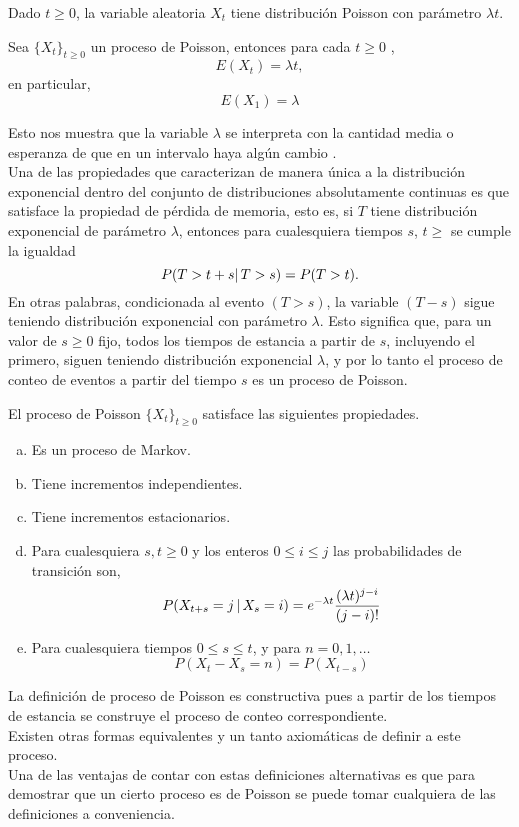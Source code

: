     \begin{Prop}
        Dado $t\geq 0$, la variable aleatoria $X_t$ tiene distribución Poisson con parámetro $\lambda t$.
    \end{Prop}
   \begin{Cor}
   Sea $\{X_t\}_{t\geq 0}$ un proceso de Poisson, entonces para cada $t\geq 0$ , $$E(X_t)=\lambda t,$$ en particular, 
   $$E(X_1)=\lambda$$
   
   \end{Cor}
   Esto nos muestra que la variable $\lambda$ se interpreta con la cantidad media o esperanza de que en un intervalo haya algún cambio .\\
   Una de las propiedades que caracterizan de manera única a la distribución exponencial dentro del conjunto de distribuciones absolutamente continuas es que satisface la propiedad de pérdida de memoria, esto es, si $T$ tiene distribución exponencial de parámetro $\lambda$, entonces para cualesquiera tiempos $s$, $t\geq$ se cumple la igualdad $$P(T>t+s|\thinspace T>s)=P(T>t).$$
    En otras palabras, condicionada al evento $(T>s)$, la variable $(T-s)$ sigue teniendo distribución exponencial con parámetro $\lambda$.
    Esto significa que, para un valor de $s\geq 0$ fijo, todos los tiempos de estancia a partir de $s$, incluyendo el primero, siguen teniendo distribución exponencial $\lambda$, y por lo tanto el proceso de conteo de eventos a partir del tiempo $s$ es un proceso de Poisson.
    \begin{Prop} 
        El proceso de Poisson $\{X_t\}_{t\geq 0}$ satisface las siguientes
        propiedades.
        \label{prop_procPoisson_constructiva}
        \begin{enumerate}[a)]
            \item  Es un proceso de Markov.
            \item Tiene incrementos independientes.
            \item Tiene incrementos estacionarios.
            \item Para cualesquiera $s,t \geq 0$ y los enteros $0\leq i\leq j$ las probabilidades de transición son, $$P(X_{t+s}=j\thinspace|\thinspace X_s=i)= e^{-\lambda t}\frac{(\lambda t)^{j-i}}{(j-i)!}$$
            \item Para cualesquiera tiempos $0\leq s\leq t$, y para $n=0,1,\ldots$
            $$P(X_t-X_s=n)=P(X_{t-s})$$
        \end{enumerate}
    \end{Prop}
    La definición de proceso de Poisson es constructiva pues a partir de los
    tiempos de estancia se construye el proceso de conteo correspondiente.\\
    Existen otras formas equivalentes y un tanto axiomáticas de definir a este
    proceso.\\
    Una de las ventajas de contar con estas definiciones alternativas es que para demostrar que un cierto proceso es de Poisson se puede tomar cualquiera de las definiciones a conveniencia.\\
